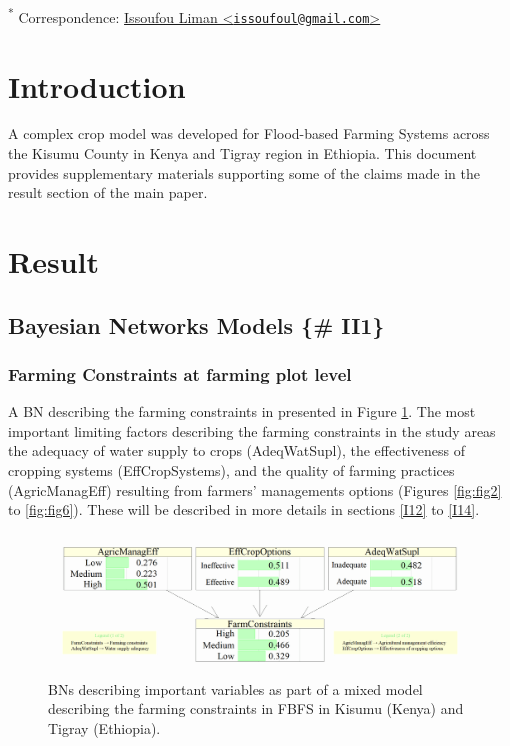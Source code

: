 \documentclass[12pt,oneside]{article}
\begin{document}
\textsuperscript{*} Correspondence: \href{mailto:issoufoul@gmail.com}{Issoufou Liman \textless{}\href{mailto:issoufoul@gmail.com}{\nolinkurl{issoufoul@gmail.com}}\textgreater{}}

\hypertarget{I}{%
\section{Introduction}\label{I}}

A complex crop model was developed for Flood-based Farming Systems across the Kisumu County in Kenya and Tigray region in Ethiopia. This document provides supplementary materials supporting some of the claims made in the result section of the main paper.

\hypertarget{II}{%
\section{Result}\label{II}}

\hypertarget{bayesian-networks-models-ii1}{%
\subsection{Bayesian Networks Models \{\# II1\}}\label{bayesian-networks-models-ii1}}

\hypertarget{II11}{%
\subsubsection{Farming Constraints at farming plot level}\label{II11}}

A BN describing the farming constraints in presented in Figure \ref{fig:fig1}. The most important limiting factors describing the farming constraints in the study areas the adequacy of water supply to crops (AdeqWatSupl), the effectiveness of cropping systems (EffCropSystems), and the quality of farming practices (AgricManagEff) resulting from farmers' managements options (Figures \ref{fig:fig2} to \ref{fig:fig6}). These will be described in more details in sections \ref{I12} to \ref{I14}.

\begin{figure}[!htbp]

{\centering \includegraphics[width=1\linewidth,]{figures/Modelling_FBFS_Suppl_Farming_Constraints_BNs_plot} 

}

\caption{BNs describing important variables as part of a mixed model describing the farming constraints in FBFS in Kisumu (Kenya) and Tigray (Ethiopia).}\label{fig:fig1}
\end{figure}
\end{document}
